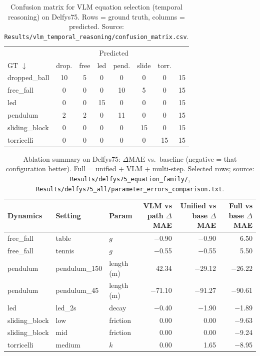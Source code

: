 \begin{table}[t]
  \centering
  \caption{Confusion matrix for VLM equation selection (temporal reasoning) on Delfys75. Rows = ground truth, columns = predicted. Source: \texttt{Results/vlm\_temporal\_reasoning/confusion\_matrix.csv}.}
  \label{tab:vlm_confusion}
  \small
  \begin{tabular}{@{}l|cccccc|c@{}}
    \toprule
    & \multicolumn{6}{c}{Predicted} & \\
    GT $\downarrow$ & drop. & free & led & pend. & slide & torr. & \\
    \midrule
    dropped\_ball & 10 & 5 & 0 & 0 & 0 & 0 & 15 \\
    free\_fall & 0 & 0 & 0 & 10 & 5 & 0 & 15 \\
    led & 0 & 0 & 15 & 0 & 0 & 0 & 15 \\
    pendulum & 2 & 2 & 0 & 11 & 0 & 0 & 15 \\
    sliding\_block & 0 & 0 & 0 & 0 & 15 & 0 & 15 \\
    torricelli & 0 & 0 & 0 & 0 & 0 & 15 & 15 \\
    \bottomrule
  \end{tabular}
\end{table}

\begin{table}[t]
  \centering
  \caption{Ablation summary on Delfys75: $\Delta\mathrm{MAE}$ vs.\ baseline (negative = that configuration better). Full = unified + VLM + multi-step. Selected rows; source: \texttt{Results/delfys75\_equation\_family/}, \texttt{Results/delfys75\_all/parameter\_errors\_comparison.txt}.}
  \label{tab:ablation_summary}
  \small
  \begin{tabular}{@{}lllrrr@{}}
    \toprule
    Dynamics & Setting & Param & VLM vs path $\Delta$MAE & Unified vs base $\Delta$MAE & Full vs base $\Delta$MAE \\
    \midrule
    free\_fall & table & $g$ & $-$0.90 & $-$0.90 & 6.50 \\
    free\_fall & tennis & $g$ & $-$0.55 & $-$0.55 & 5.50 \\
    pendulum & pendulum\_150 & length (m) & 42.34 & $-$29.12 & $-$26.22 \\
    pendulum & pendulum\_45 & length (m) & $-$71.10 & $-$91.27 & $-$90.61 \\
    led & led\_2s & decay & $-$0.40 & $-$1.90 & $-$1.89 \\
    sliding\_block & low & friction & 0.00 & 0.00 & $-$9.63 \\
    sliding\_block & mid & friction & 0.00 & 0.00 & $-$9.24 \\
    torricelli & medium & $k$ & 0.00 & 1.65 & $-$8.95 \\
    \bottomrule
  \end{tabular}
\end{table}

